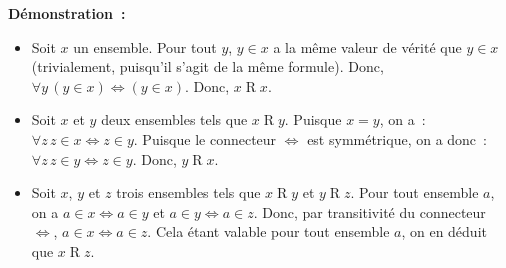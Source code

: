 \noindent\textbf{Démonstration :} 
\begin{itemize}[nosep]
    \item Soit $x$ un ensemble. Pour tout $y$, $y \in x$ a la même valeur de vérité que $y \in x$ (trivialement, puisqu'il s'agit de la même formule).
        Donc, $\forall y \, (y \in x) \Leftrightarrow (y \in x)$. 
        Donc, $x \mathrel{R} x$.
    \item Soit $x$ et $y$ deux ensembles tels que $x \mathrel{R} y$. 
        Puisque $x = y$, on a : $\forall z \, z \in x \Leftrightarrow z \in y$. 
        Puisque le connecteur $\Leftrightarrow$ est symmétrique, on a donc : $\forall z \, z \in y \Leftrightarrow z \in y$.
        Donc, $y \mathrel{R} x$.
    \item Soit $x$, $y$ et $z$ trois ensembles tels que $x \mathrel{R} y$ et $y \mathrel{R} z$. 
        Pour tout ensemble $a$, on a $a \in x \Leftrightarrow a \in y$ et $a \in y \Leftrightarrow a \in z$. 
        Donc, par transitivité du connecteur $\Leftrightarrow$, $a \in x \Leftrightarrow a \in z$. 
        Cela étant valable pour tout ensemble $a$, on en déduit que $x \mathrel{R} z$.
\end{itemize}
\done

\medskip


